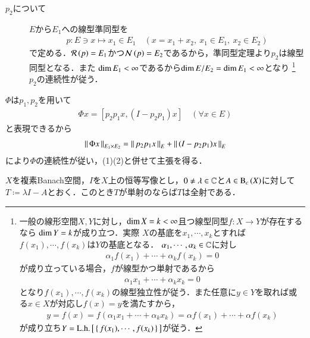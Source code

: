 \begin{prf}
\begin{description}
\begin{description}
					\item[$p_2$について] $E$から$E_1$への線型準同型を
						\begin{align}
							p:E \ni x \longmapsto x_1 \in E_1 \quad (x = x_1 + x_2,\ x_1 \in E_1,\ x_2 \in E_2)
						\end{align}
						で定める．$\mathcal{R}\left( p \right) = E_1$かつ$\mathcal{N}\left( p \right) = E_2$であるから，準同型定理より$p_2$は線型同型となる．また
						$\operatorname{dim} E_1 < \infty$であるから$\operatorname{dim} E/E_2 = \operatorname{dim} E_1 < \infty$となり
						\footnote{
							一般の線形空間$X,Y$に対し，$\operatorname{dim} X = k < \infty$且つ線型同型$f:X \rightarrow Y$が存在するなら
							$\operatorname{dim} Y = k$が成り立つ．実際
							$X$の基底を$x_1,\cdots,x_k$とすれば
							$f(x_1),\cdots,f(x_k)$は$Y$の基底となる．
							$\alpha_1,\cdots,\alpha_k \in \mathbb{C}$に対し
							\begin{align}
								\alpha_1 f(x_1) + \cdots + \alpha_k f(x_k) = 0
							\end{align}
							が成り立っている場合，$f$が線型かつ単射であるから
							\begin{align}
								\alpha_1 x_1 + \cdots + \alpha_k x_k = 0
							\end{align}
							となり$f(x_1),\cdots,f(x_k)$の線型独立性が従う．また任意に$y \in Y$を取れば或る$x \in X$が対応し$f(x) = y$を満たすから，
							\begin{align}
								y = f(x) = f(\alpha_1 x_1 + \cdots + \alpha_k x_k) = \alpha f(x_1) + \cdots + \alpha f(x_k)
							\end{align}
							が成り立ち$Y = \mathrm{L.h.}\left[\, \left\{\, f(x_1),\cdots,f(x_k)\, \right\}\, \right]$が従う．
						}
						$p_2$の連続性が従う．
				\end{description}
				$\Phi$は$p_1,p_2$を用いて
				\begin{align}
					\Phi x = [p_2 p_1 x, (I - p_2 p_1) x] \quad (\forall x \in E)
				\end{align}
				と表現できるから
				\begin{align}
					\left\|\, \Phi x\, \right\|_{E_1 \times E_2} = \left\|\, p_2 p_1 x\, \right\|_{E} + \left\|\, (I - p_2 p_1) x\, \right\|_{E} 
				\end{align}
				により$\Phi$の連続性が従い，(1)(2)と併せて主張を得る．
				\QED
		\end{description}
	\end{prf}
	
	\begin{screen}
		\begin{lem}[$T$が単射なら全射]	$X$を複素Banach空間，$I$を$X$上の恒等写像とし，$0 \neq \lambda \in \mathbb{C}$と$A \in \mathrm{B}_c\left(X\right) $に対して
			$T \coloneqq \lambda I - A$とおく．このとき$T$が単射のならば$T$は全射である．
			\label{lem:T_injective_then_surjective}
		\end{lem}
	\end{screen}
	
